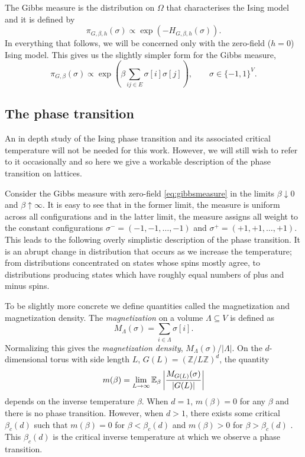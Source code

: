 	The Gibbs measure is the distribution on $\Omega$ that characterises the Ising model and it is defined by
	\begin{equation}
		\pi_{G, \beta, h}(\sigma) \propto \exp(-H_{G, \beta, h}(\sigma)).
		\label{eq:gibbsmeasurefull}
	\end{equation}
	In everything that follows, we will be concerned only with the zero-field ($h = 0$) Ising model. This gives us the slightly simpler form for the Gibbs measure,
	\begin{equation}
		\pi_{G, \beta}(\sigma) \propto \exp \left( \beta \sum_{ij \in E} \sigma[i] \sigma[j] \right), \qquad \sigma \in \{-1, 1\}^V.
		\label{eq:gibbsmeasure}
	\end{equation}

	\subsection{The phase transition}
	\label{sec:the phase transition}
	An in depth study of the Ising phase transition and its associated critical temperature will not be needed for this work. However, we will still wish to refer to it occasionally and so here we give a workable description of the phase transition on lattices.

	Consider the Gibbs measure with zero-field \eqref{eq:gibbsmeasure} in the limits $\beta \downarrow 0$ and $\beta \uparrow \infty$. It is easy to see that in the former limit, the measure is uniform across all configurations and in the latter limit, the measure assigns all weight to the constant configurations $\sigma^- = (-1, -1, \dots, -1)$ and $\sigma^+ = (+1, +1, \dots, +1)$. This leads to the following overly simplistic description of the phase transition. It is an abrupt change in distribution that occurs as we increase the temperature; from distributions concentrated on states whose spins mostly agree, to distributions producing states which have roughly equal numbers of plus and minus spins.

	To be slightly more concrete we define quantities called the magnetization and magnetization density. The \emph{magnetization} on a volume $\Lambda \subseteq V$ is defined as 
	\begin{equation}
		M_\Lambda(\sigma) = \sum_{i \in \Lambda} \sigma[i].
	\end{equation}
	Normalizing this gives the \emph{magnetization density}, $M_\Lambda(\sigma)/|\Lambda|$. On the $d$-dimensional torus with side length $L$, $G(L) = (\mathbb{Z}/L\mathbb{Z})^d$, the quantity
	\begin{equation}
		m(\beta) = \lim_{L \rightarrow \infty} \mathbb{E}_\beta \left|\frac{M_{G(L)}(\sigma)}{|G(L)|} \right|
		\label{eq:limitmagnetizationdensity}
	\end{equation}
	depends on the inverse temperature $\beta$. When $d = 1$, $m(\beta) = 0$ for any $\beta$ and there is no phase transition. However, when $d > 1$, there exists some critical $\beta_c(d)$ such that $m(\beta) = 0$ for $\beta < \beta_c(d)$ and $m(\beta) > 0$ for $\beta > \beta_c(d)$ \cite{Friedli2017-xm}. This $\beta_c(d)$ is the critical inverse temperature at which we observe a phase transition.

